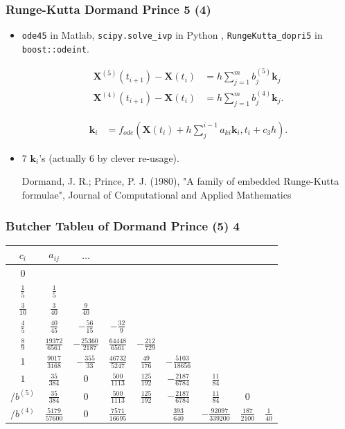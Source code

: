 \documentclass{beamer}
\begin{document}
\begin{frame}
\frametitle{Runge-Kutta Dormand Prince 5 (4)}

\begin{itemize}
\item <1->\lstinline{ode45} in Matlab, \lstinline{scipy.solve_ivp} in Python , \lstinline{RungeKutta_dopri5} in \lstinline{boost::odeint}.

\begin{align*}
\mathbf{X}^{(5)}(t_{i+1})-\mathbf{X}(t_{i}) &=  h \sum_{j=1}^{m} b_j^{(5)} \mathbf{k}_j\\
\mathbf{X}^{(4)}(t_{i+1})-\mathbf{X}(t_{i}) &=  h \sum_{j=1}^{m} b_j^{(4)} \mathbf{k}_j.
\end{align*}

\begin{align*}
\mathbf{k}_i &= f_{ode}(\mathbf{X}(t_i)+h \sum_j^{i-1} a_{ki} \mathbf{k}_i,t_i+c_3 h).
\end{align*}

\item <2-> 7 $\mathbf{k}_i$'s (actually 6 by clever re-usage).

{\color{gray} Dormand, J. R.; Prince, P. J. (1980), "A family of embedded Runge-Kutta formulae", Journal of Computational and Applied Mathematics}
\end{itemize}
\end{frame}

\begin{frame}
\frametitle{Butcher Tableu of Dormand Prince (5) 4}
\begin{tabular}{c | @{\quad} c @{\quad} c @{\quad} c @{\quad} c @{\quad} c @{\quad} c @{\quad} c @{\quad} c}
$c_i$ & $a_{ij}$ & $\hdots$\\
\midrule
$0$ \\
$\frac{1}{5}$ & $\frac{1}{5}$\\
$\frac{3}{10}$ & $\frac{3}{40}$ &  $\frac{9}{40}$\\
$\frac{4}{5}$ & $\frac{40}{45}$ &  $-\frac{56}{15}$  &  $-\frac{32}{9}$\\
$\frac{8}{9}$ & $\frac{19372}{6561}$ & $-\frac{25360}{2187}$ & $\frac{64448}{6561}$ & $-\frac{212}{729}$\\
$1$ & $\frac{9017}{3168}$ & $-\frac{355}{33}$ & $\frac{46732}{5247}$ & $\frac{49}{176}$  & $-\frac{5103}{18656}$\\
$1$ & $\frac{35}{384}$  & $0$	 & $\frac{500}{1113}$ & $\frac{125}{192}$ & $-\frac{2187}{6784}$ & $\frac{11}{84}$\\
\midrule
$/b^{(5)}$  & $\frac{35}{384}$ & $0$ & $\frac{500}{1113}$ & $\frac{125}{192}$ & $-\frac{2187}{6784}$ & $\frac{11}{84}$ & $0$\\
$/b^{(4)}$ & $\frac{5179}{57600}$ & $0$ & $\frac{7571}{16695}$ & & $\frac{393}{640}$ & $-\frac{92097}{339200}$& $\frac{187}{2100}$ & $\frac{1}{40}$
\end{tabular}
\end{frame}
\end{document}

